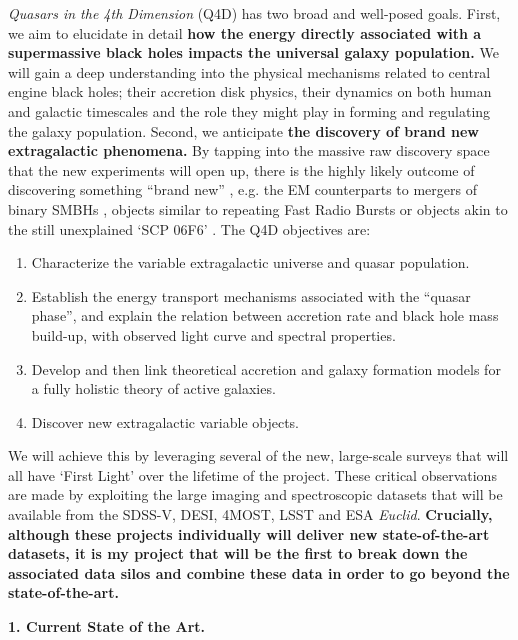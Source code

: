 \documentclass[oneside, a4paper, onecolumn, 11pt]{article}
\begin{document}
\smallskip
\smallskip
\noindent
{\it Quasars in the 4th Dimension} (Q4D) has two broad and well-posed
goals. First, we aim to elucidate in detail {\bf how the energy
directly associated with a supermassive black holes impacts the
universal galaxy population.} We will gain a deep understanding into
the physical mechanisms related to central engine black holes; their
accretion disk physics, their dynamics on both human and galactic
timescales and the role they might play in forming and regulating the
galaxy population.  Second, we anticipate {\bf the discovery of brand
new extragalactic phenomena.}  By tapping into the massive raw
discovery space that the new experiments will open up, there is the
highly likely outcome of discovering something ``brand new''
\citep{Ivezic2008}, e.g. the EM counterparts to mergers of binary
SMBHs \citep[][potentially with their associated gravitational wave
chirp and ringdown]{LSST_ScienceBook}, objects similar to repeating
Fast Radio Bursts \citep{Spitler2016} or objects akin to the still
unexplained `SCP 06F6' \citep{Barbary2009}.  The Q4D objectives are:
\begin{enumerate}
  \item Characterize the variable extragalactic universe and quasar
    population.
  \item Establish the energy transport mechanisms associated with the
    ``quasar phase'', and explain the relation between accretion rate and
    black hole mass build-up, with observed light curve and spectral
    properties.
  \item Develop and then link theoretical accretion and galaxy
    formation models for a fully holistic theory of active galaxies.
  \item Discover new extragalactic variable objects.
\end{enumerate}
  
\smallskip
\smallskip
\noindent
We will achieve this by leveraging several of the new, large-scale
surveys that will all have `First Light' over the lifetime of the
project.  These critical observations are made by exploiting the large
imaging and spectroscopic datasets that will be available from the
SDSS-V, DESI, 4MOST, LSST and ESA {\it Euclid}. {\bf Crucially,
although these projects individually will deliver new state-of-the-art
datasets, it is my project that will be the first to break down the
associated data silos and combine these data in order to go beyond the
state-of-the-art.}


\medskip
\medskip
\noindent
\large
{\bf{\textcolor{Cerulean}{1. Current State of the Art.}}}
\normalsize
\end{document}
